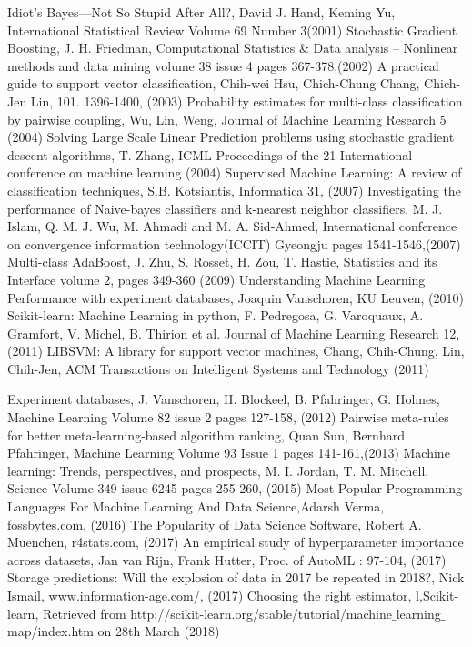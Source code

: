 \documentclass[a4paper,10pt]{article}
\begin{document}
\begin{thebibliography}{9}
 Idiot’s Bayes—Not So Stupid After All?, David J. Hand, Keming Yu, International Statistical Review Volume 69 Number 3(2001)
 Stochastic Gradient Boosting, J. H. Friedman,  Computational Statistics \& Data analysis – Nonlinear methods and data mining volume 38 issue 4 pages 367-378,(2002)
 A practical guide to support vector classification, Chih-wei Hsu, Chich-Chung Chang, Chich-Jen Lin, 101. 1396-1400, (2003)
 Probability estimates for multi-class classification by pairwise coupling, Wu, Lin, Weng, Journal of Machine Learning Research 5 (2004)
 Solving Large Scale Linear Prediction problems using stochastic gradient descent algorithms, T. Zhang, ICML Proceedings of the 21 International conference on machine learning (2004)
 Supervised Machine Learning: A review of classification techniques, S.B. Kotsiantis, Informatica 31, (2007)
 Investigating the performance of Naive-bayes classifiers and k-nearest neighbor classifiers, M. J. Islam, Q. M. J. Wu, M. Ahmadi and M. A. Sid-Ahmed, International conference on convergence information technology(ICCIT) Gyeongju pages 1541-1546,(2007)
 Multi-class AdaBoost, J. Zhu, S. Rosset, H. Zou, T. Hastie, Statistics and its Interface volume 2, pages 349-360 (2009)
 Understanding Machine Learning Performance with experiment databases, Joaquin Vanschoren, KU Leuven, (2010)
 Scikit-learn: Machine Learning in python, F. Pedregosa, G. Varoquaux, A. Gramfort, V. Michel, B. Thirion et al. Journal of Machine Learning Research 12, (2011)
LIBSVM: A library for support vector machines, Chang, Chih-Chung, Lin, Chih-Jen, ACM Transactions on Intelligent Systems and Technology (2011)

 Experiment databases, J. Vanschoren, H. Blockeel, B. Pfahringer, G. Holmes, Machine Learning Volume 82 issue 2 pages 127-158, (2012)
 Pairwise meta-rules for better meta-learning-based algorithm ranking, Quan Sun, Bernhard Pfahringer, Machine Learning Volume 93 Issue 1 pages 141-161,(2013)
 Machine learning: Trends, perspectives, and prospects, M. I. Jordan, T. M. Mitchell, Science Volume 349 issue 6245 pages 255-260, (2015)
 Most Popular Programming Languages For Machine Learning And Data Science,Adarsh Verma, fossbytes.com, (2016)
 The Popularity of Data Science Software, Robert A. Muenchen, r4stats.com, (2017)
 An empirical study of hyperparameter importance across datasets, Jan van Rijn, Frank Hutter, Proc. of AutoML : 97-104, (2017)
 Storage predictions: Will the explosion of data in 2017 be repeated in 2018?, Nick Ismail, www.information-age.com/, (2017)
 Choosing the right estimator, l,Scikit-learn, Retrieved from http://scikit-learn.org/stable/tutorial/machine$\_$learning$\_$map/index.htm on 28th March (2018)
     
\end{thebibliography}
\endgroup
\end{document}
